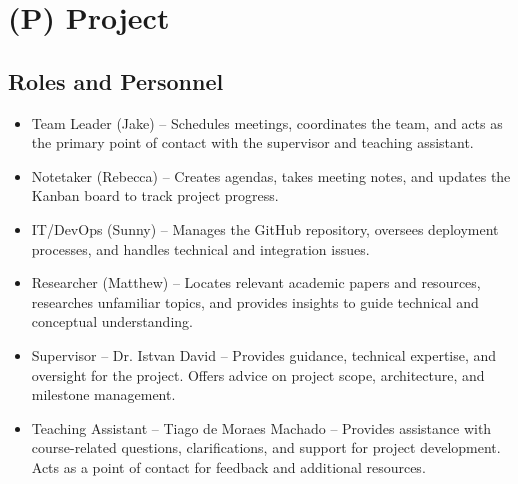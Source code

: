 \documentclass{article}
\begin{document}
\newpage{}


\section*{(P) Project}\label{sec:srs_project}
\renewcommand{\thesubsection}{P.\arabic{subsection}}
\renewcommand{\theHsubsection}{P.\arabic{subsection}}
\setcounter{subsection}{0}

\subsection{Roles and Personnel}\label{subsec:roles}
\begin{itemize}
    \item {Team Leader (Jake)} – Schedules meetings, coordinates the team, and acts as the primary point of contact with the supervisor and teaching assistant.
    \item {Notetaker (Rebecca)} – Creates agendas, takes meeting notes, and updates the Kanban board to track project progress.
    \item {IT/DevOps (Sunny)} – Manages the GitHub repository, oversees deployment processes, and handles technical and integration issues.
    \item {Researcher (Matthew)} – Locates relevant academic papers and resources, researches unfamiliar topics, and provides insights to guide technical and conceptual understanding.
    \item {Supervisor – Dr. Istvan David} – Provides guidance, technical expertise, and oversight for the project. Offers advice on project scope, architecture, and milestone management.
    \item {Teaching Assistant – Tiago de Moraes Machado} – Provides assistance with course-related questions, clarifications, and support for project development. Acts as a point of contact for feedback and additional resources.
\end{itemize}
\end{document}
